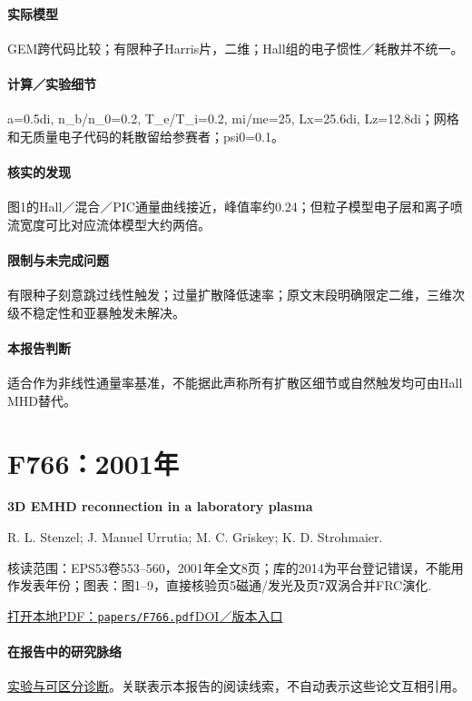 \paragraph{实际模型}GEM跨代码比较；有限种子Harris片，二维；Hall组的电子惯性／耗散并不统一。

\paragraph{计算／实验细节}a=0.5di, n\_b/n\_0=0.2, T\_e/T\_i=0.2, mi/me=25, Lx=25.6di, Lz=12.8di；网格和无质量电子代码的耗散留给参赛者；psi0=0.1。

\paragraph{核实的发现}图1的Hall／混合／PIC通量曲线接近，峰值率约0.24；但粒子模型电子层和离子喷流宽度可比对应流体模型大约两倍。

\paragraph{限制与未完成问题}有限种子刻意跳过线性触发；过量扩散降低速率；原文末段明确限定二维，三维次级不稳定性和亚暴触发未解决。

\paragraph{本报告判断}适合作为非线性通量率基准，不能据此声称所有扩散区细节或自然触发均可由Hall MHD替代。

\section{F766：2001年}\label{paper:F766}

\textbf{3D EMHD reconnection in a laboratory plasma}\citep{F766}\

R. L. Stenzel;  J. Manuel Urrutia;  M. C. Griskey;  K. D. Strohmaier.

\textsf{核读范围：}EPS53卷553–560，2001年全文8页；库的2014为平台登记错误，不能用作发表年份；\textsf{图表：}图1–9，直接核验页5磁通/发光及页7双涡合并FRC演化.

\href{run:papers/F766.pdf}{打开本地PDF：\texttt{papers/F766.pdf}}\quad\href{https://doi.org/10.1186/bf03353269}{DOI／版本入口}

\paragraph{在报告中的研究脉络}\hyperref[story:diagnostic]{实验与可区分诊断}。关联表示本报告的阅读线索，不自动表示这些论文互相引用。

